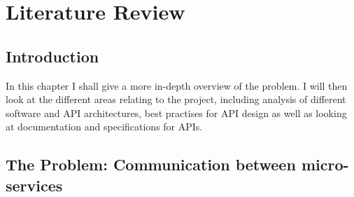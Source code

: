 \chapter{Literature Review}

\section{Introduction}
In this chapter I shall give a more in-depth overview of the problem. I will then look at the different areas relating to the project, including analysis of different software and API architectures, best practises for API design as well as looking at documentation and specifications for APIs.

\section{The Problem: Communication between micro-services}

